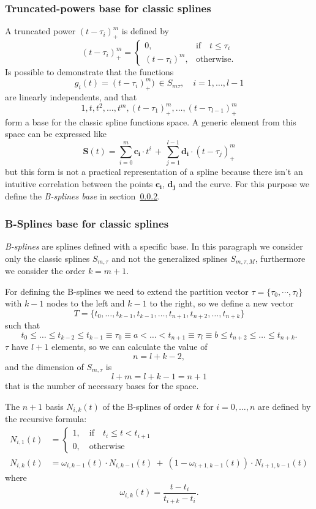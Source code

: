 \documentclass[a4paper]{article}
\begin{document}
\subsubsection{Truncated-powers base for classic splines}\label{sec:truncpow}
A truncated power $(t-\tau_i)_+^m$ is
defined by
$$
(t-\tau_i)_+^m=
\begin{cases}
  0,&\mbox{if}\quad t\leq\tau_i\\
  (t-\tau_i)^m, &\mbox{otherwise}.
\end{cases}
$$
Is possible to demonstrate that the functions
$$
g_i(t)=(t-\tau_i)_+^m)\ \in S_{m\tau},\quad i=1,\dots,l-1
$$
are linearly independents, and that
$$
1,t,t^2,\dots,t^m,(t-\tau_1)_+^m,\dots,(t-\tau_{l-1})_+^m
$$
form a base for the classic spline functions space. A generic element
from this space can be expressed like
$$
\mathbf{S}(t)=\sum_{i=0}^m \mathbf{c_i}\cdot t^i\, +\, \sum_{j=1}^{l-1} \mathbf{d_i}\cdot (t-\tau_j)_+^m
$$
but this form is not a practical representation of a spline because
there isn't an intuitive correlation between the points
$\mathbf{c_i}$, $\mathbf{d_j}$ and the curve. For this purpose we
define the \emph{B-splines base} in section~\ref{sec:bsplines}.

\subsubsection{B-Splines base for classic splines}\label{sec:bsplines}
\emph{B-splines} are splines defined with a specific base. In this
paragraph we consider only the classic splines $S_{m,\tau}$ and not
the generalized splines $S_{m,\tau,M}$, furthermore we consider the
order $k=m+1$.

For defining the B-splines we need to extend the partition vector
$\tau=\{\tau_0,\cdots,\tau_l\}$ with $k-1$ nodes to the left and $k-1$ to
the right, so we define a new vector
$$
T=\{t_0,\dots,t_{k-1},t_{k-1},\dots,t_{n+1},t_{n+2},\dots,t_{n+k}\}
$$
such that
$$
t_0\leq\dots\leq t_{k-2}\leq t_{k-1}\equiv\tau_0\equiv a<\dots<
t_{n+1}\equiv\tau_l\equiv b\leq t_{n+2}\leq\dots\leq t_{n+k}.
$$
$\tau$ have $l+1$ elements, so we can calculate the value of
$$
n=l+k-2,
$$
and the dimension of $S_{m,\tau}$ is
$$
l+m=l+k-1=n+1
$$
that is the number of necessary bases for the space.

The $n+1$ basis $N_{i,k}(t)$ of the B-splines of order $k$ for
$i=0,\dots,n$ are defined by the 
recursive formula:
\begin{align*}
  N_{i,1}(t) &=
  \begin{cases}
    1,\quad \mbox{if}\quad t_i\leq t<t_{i+1}\\
    0,\quad \mbox{otherwise}
  \end{cases}\\
  N_{i,k}(t) &= \omega_{i,k-1}(t)\cdot N_{i,k-1}(t)\ +\
  (1-\omega_{i+1,k-1}(t))\cdot N_{i+1,k-1}(t)
\end{align*}
where
$$
\omega_{i,k}(t) = \frac{t-t_i}{t_{i+k}-t_i}.
$$
\end{document}
